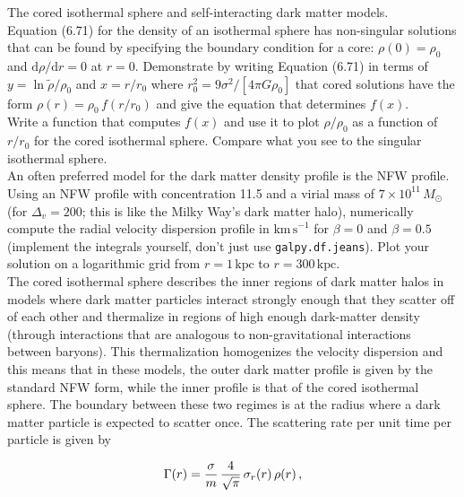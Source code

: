 \documentclass[12pt]{article}
\begin{document}
 The cored isothermal sphere and
self-interacting dark matter models.\\

 Equation (6.71) for the density of an isothermal
sphere has non-singular solutions that can be found by specifying the
boundary condition for a core: $\rho(0) = \rho_0$ and $\mathrm{d} \rho
/ \mathrm{d} r = 0$ at $r=0$. Demonstrate by writing Equation (6.71)
in terms of $y=\ln \tilde{\rho}/\rho_0$ and $x = r/r_0$ where $r_0^2 =
9\sigma^2/[4\pi G\rho_0]$ that cored solutions have the form $\rho(r)
= \rho_0\,f(r/r_0)$ and give the equation that determines $f(x)$.\\

 Write a function that computes $f(x)$ and use it to
plot $\rho/\rho_0$ as a function of $r/r_0$ for the cored isothermal
sphere. Compare what you see to the singular isothermal sphere.\\

 An often preferred model for the dark matter
density profile is the NFW profile. Using an NFW profile with
concentration 11.5 and a virial mass of $7\times 10^{11}\,M_\odot$
(for $\Delta_v = 200$; this is like the Milky Way's dark matter halo),
numerically compute the radial velocity dispersion profile in
$\mathrm{km\,s}^{-1}$ for $\beta = 0$ and $\beta = 0.5$ (implement the
integrals yourself, don't just use \texttt{galpy.df.jeans}). Plot your
solution on a logarithmic grid from $r = 1\,\mathrm{kpc}$ to
$r=300\,\mathrm{kpc}$.\\

 The cored isothermal sphere describes the inner
regions of dark matter halos in models where dark matter particles
interact strongly enough that they scatter off of each other and
thermalize in regions of high enough dark-matter density (through
interactions that are analogous to non-gravitational interactions
between baryons). This thermalization homogenizes the velocity
dispersion and this means that in these models, the outer dark matter
profile is given by the standard NFW form, while the inner profile is
that of the cored isothermal sphere. The boundary between these two
regimes is at the radius where a dark matter particle is expected to
scatter once. The scattering rate per unit time per particle is given by

\begin{equation}
  \Gamma(r) = {\sigma \over m}\,{4 \over \sqrt{\pi}}\,\sigma_r(r)\,\rho(r)\,,
\end{equation}
\end{document}
